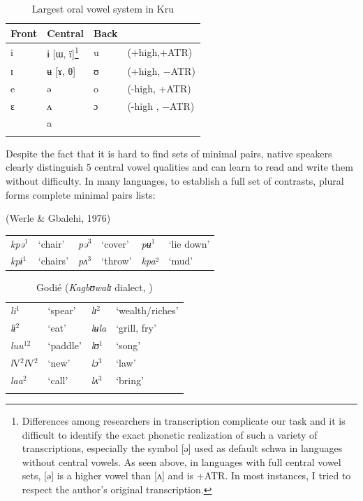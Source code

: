 \documentclass[output=paper,newtxmath,modfonts,nonflat,draft]{langsci/langscibook}
\begin{document}
\begin{table}
\begin{tabular}{llll}
\lsptoprule
Front & Central & Back\\
\midrule
i  &  ɨ [ɯ, ï]\footnote{Differences among researchers in transcription complicate our task and it is difficult to identify the exact phonetic realization of such a variety of transcriptions, especially the symbol [ə] used as default schwa in languages without central vowels. As seen above, in languages with full central vowel sets, [ə] is a higher vowel than [ʌ] and is +ATR. In most instances, I tried to respect the author’s original transcription.} & u  &  (+high,+ATR)\\

ɪ  &  ʉ [ɤ, θ]  & ʊ  &  (+high, −ATR) \\

e  &  ə  &  o  &  (-high, +ATR)\\

ɛ  &  ʌ  &  ɔ  &  (-high , −ATR) \\

& a\\
\lspbottomrule
\end{tabular}	
\caption{Largest oral vowel system in Kru}
\label{tab:zogbo:5}
\end{table}

Despite the fact that it is hard to find  sets of minimal pairs, native speakers clearly distinguish 5 central vowel qualities and can learn to read and write them without difficulty. In many languages, to establish a full set of contrasts, plural forms complete minimal pairs lists: 

\ea {}  (Werle \& Gbalehi, 1976)

\begin{tabular}{llllll}
\textit{kpə}$^1$ & ‘chair’  &  \textit{pə}$^3$ &  ‘cover’  &  \textit{pʉ}$^1$& ‘lie down’\\

\textit{kpɨ}$^1$ &  ‘chairs’ & \textit{pʌ}$^3$   & ‘throw’ & \textit{kpa}²  &  ‘mud’ \\
\end{tabular}
\z

\begin{table}
\begin{tabular}{llll}
\lsptoprule	
\textit{li}$^1$  &  ‘spear’  &  \textit{lɪ}$^2$ & ‘wealth/riches’\\

\textit{lɨ}$^2$  &  ‘eat’  &  \textit{lʉla}  &  ‘grill, fry’\\

\textit{luu}$^{12}$ &   ‘paddle’ & \textit{lʊ}$^1$ & ‘song’\\

\textit{l}V$^2$\textit{l}V$^2$ & ‘new’    & \textit{lɔ}$^3$  &  ‘law’ \\

\textit{laa}$^2$ & ‘call’ &   \textit{lʌ}$^3$ &    ‘bring’ \\
\lspbottomrule
\end{tabular}
\caption{Godié (\textit{Kagbʊwalɪ} dialect, \citealt{Association2004})}
\label{tab:zogbo:6}
\end{table}
\end{document}
